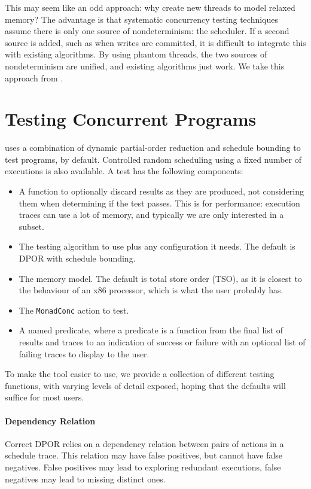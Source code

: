 This may seem like an odd approach: why create new threads to model relaxed
memory?  The advantage is that systematic concurrency testing techniques assume
there is only one source of nondeterminism: the scheduler.  If a second source
is added, such as when writes are committed, it is difficult to integrate this
with existing algorithms.  By using phantom threads, the two sources of
nondeterminism are unified, and existing algorithms just work.  We take this
approach from \cite{zhang2015}.

\section{Testing Concurrent Programs}
\label{sec:dejafu-testing}

\dejafu{} uses a combination of dynamic partial-order reduction and
schedule bounding to test programs, by default.  Controlled random
scheduling using a fixed number of executions is also available.  A
\dejafu{} test has the following components:

\begin{itemize}
\item A function to optionally discard results as they are produced,
  not considering them when determining if the test passes.  This is
  for performance: execution traces can use a lot of memory, and
  typically we are only interested in a subset.
\item The testing algorithm to use plus any configuration it needs.
  The default is DPOR with schedule bounding.
\item The memory model.  The default is total store order (TSO), as it
  is closest to the behaviour of an x86 processor\cite{owens2009},
  which is what the user probably has.
\item The \verb|MonadConc| action to test.
\item A named predicate, where a predicate is a function from the
  final list of results and traces to an indication of success or
  failure with an optional list of failing traces to display to the
  user.
\end{itemize}

To make the tool easier to use, we provide a collection of different
testing functions, with varying levels of detail exposed, hoping that
the defaults will suffice for most users.

\paragraph{Dependency Relation}
Correct DPOR relies on a dependency relation between pairs of actions
in a schedule trace.  This relation may have false positives, but
cannot have false negatives.  False positives may lead to exploring
redundant executions, false negatives may lead to missing distinct
ones.

